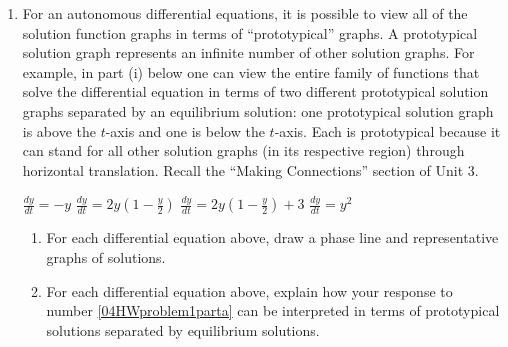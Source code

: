 \begin{enumerate}
\item For an autonomous differential equations, it is possible to view all of the solution function graphs in terms of ``prototypical'' graphs. A prototypical solution graph represents an infinite number of other solution graphs. For example, in part (i) below one can view the entire family of functions that solve the differential equation in terms of two different prototypical solution graphs separated by an equilibrium solution: one prototypical solution graph is above the $t$-axis and one is below the $t$-axis. Each is prototypical because it can stand for all other solution graphs (in its respective region) through horizontal translation. Recall the ``Making Connections'' section of Unit 3. \label{04HWproblem1}
\begin{hnumerate}
\hitem    $\displaystyle\frac{dy}{dt}=-y$    \hitem $\displaystyle\frac{dy}{dt}=2y\left(1-\frac{y}{2}\right)$        \hitem $\displaystyle\frac{dy}{dt}=2y\left(1-\frac{y}{2}\right)+3$        \hitem   $\displaystyle\frac{dy}{dt}=y^2$ \end{hnumerate}
\begin{enumerate}
\item For each differential equation above, draw a phase line and representative graphs of solutions. \label{04HWproblem1parta}
\item For each differential equation above, explain how your response to number \ref{04HWproblem1parta} can be interpreted in terms of prototypical solutions separated by equilibrium solutions. \label{04HWproblem1partb} 
\end{enumerate}


\end{enumerate}
